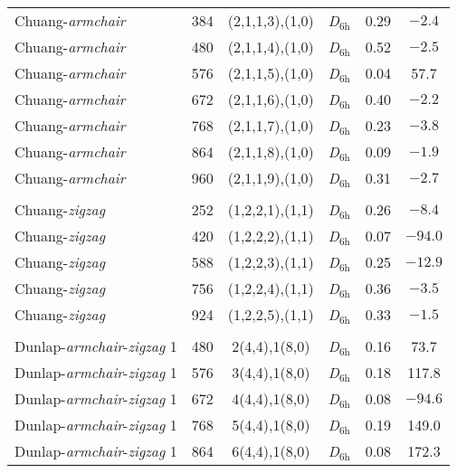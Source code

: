 \begin{table}[htbp!]
{\begin{tabular}{lccccS[table-format = 3.1]}
    Chuang-\textit{armchair}& 384   & (2,1,1,3),(1,0) & \textit{D}$_{6\text{h}}$   & 0.29  & $\num{-2.4}$ \\
    Chuang-\textit{armchair}& 480   & (2,1,1,4),(1,0) & \textit{D}$_{6\text{h}}$   & 0.52  & $\num{-2.5}$ \\
    Chuang-\textit{armchair}& 576   & (2,1,1,5),(1,0) & \textit{D}$_{6\text{h}}$   & 0.04  & 57.7 \\
    Chuang-\textit{armchair}& 672   & (2,1,1,6),(1,0) & \textit{D}$_{6\text{h}}$   & 0.40  & $\num{-2.2}$ \\
    Chuang-\textit{armchair}& 768   & (2,1,1,7),(1,0) & \textit{D}$_{6\text{h}}$   & 0.23  & $\num{-3.8}$ \\
    Chuang-\textit{armchair}& 864   & (2,1,1,8),(1,0) & \textit{D}$_{6\text{h}}$   & 0.09  & $\num{-1.9}$ \\
    Chuang-\textit{armchair}& 960   & (2,1,1,9),(1,0) & \textit{D}$_{6\text{h}}$   & 0.31  & $\num{-2.7}$ \\
          &       &       &       &       &  \\
    Chuang-\textit{zigzag} & 252   & (1,2,2,1),(1,1) & \textit{D}$_{6\text{h}}$   & 0.26  & $\num{-8.4}$ \\
    Chuang-\textit{zigzag} & 420   & (1,2,2,2),(1,1) & \textit{D}$_{6\text{h}}$   & 0.07  & $\num{-94.0}$ \\
    Chuang-\textit{zigzag} & 588   & (1,2,2,3),(1,1) & \textit{D}$_{6\text{h}}$   & 0.25  & $\num{-12.9}$ \\
    Chuang-\textit{zigzag} & 756   & (1,2,2,4),(1,1) & \textit{D}$_{6\text{h}}$   & 0.36  & $\num{-3.5}$ \\
    Chuang-\textit{zigzag} & 924   & (1,2,2,5),(1,1) & \textit{D}$_{6\text{h}}$   & 0.33  & $\num{-1.5}$ \\
          &       &       &       &       &  \\
    Dunlap-\textit{armchair}-\textit{zigzag} 1& 480   & 2(4,4),1(8,0) & \textit{D}$_{6\text{h}}$   & 0.16  & 73.7 \\
    Dunlap-\textit{armchair}-\textit{zigzag} 1& 576   & 3(4,4),1(8,0) & \textit{D}$_{6\text{h}}$   & 0.18  & 117.8 \\
    Dunlap-\textit{armchair}-\textit{zigzag} 1& 672   & 4(4,4),1(8,0) & \textit{D}$_{6\text{h}}$   & 0.08  & $\num{-94.6}$ \\
    Dunlap-\textit{armchair}-\textit{zigzag} 1& 768   & 5(4,4),1(8,0) & \textit{D}$_{6\text{h}}$   & 0.19  & 149.0 \\
    Dunlap-\textit{armchair}-\textit{zigzag} 1& 864   & 6(4,4),1(8,0) & \textit{D}$_{6\text{h}}$   & 0.08  & 172.3 \\

\end{tabular}}
\end{table}
